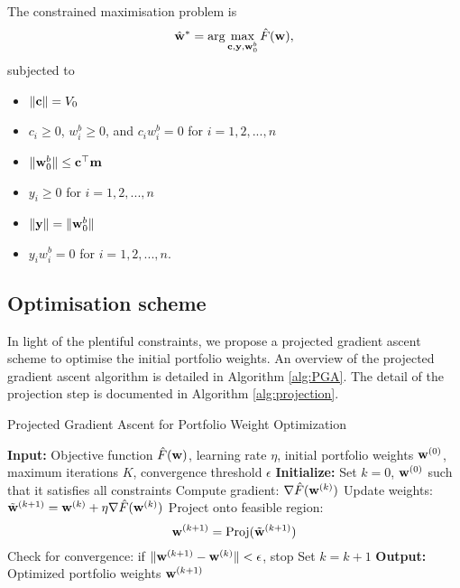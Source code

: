 \documentclass{article} %
\theoremstyle{plain}
\theoremstyle{definition} %
\begin{document}
The constrained maximisation problem is 
\begin{align}
\hat {\bf w}^* = \arg\max_{{\bf c}, {\bf y}, {\bf w}^b_0} \hat F({\bf w}),
\end{align}
subjected to 
\begin{itemize}
  \item $\|{\bf c}\| = V_0$
  \item $c_i \geq 0$, $w^b_i\geq 0$, and $c_iw^b_i = 0$ for $i=1,2,...,n$
  \item $\|{\bf w}^b_0\| \leq {\bf c}^\top {\bf m}$
  \item $y_i \geq 0$ for $i=1,2,...,n$
  \item $\|{\bf y}\| = \|{\bf w}^b_0\|$
  \item $y_iw^b_i = 0$ for $i=1,2,...,n$.
  \end{itemize}

\subsection{Optimisation scheme}
In light of the plentiful constraints, we propose a projected gradient ascent scheme to optimise the initial portfolio weights. 
 An overview of the projected gradient ascent algorithm is detailed in Algorithm \ref{alg:PGA}. 
 The detail of the projection step is documented in Algorithm \ref{alg:projection}.

\begin{algorithm}
  \caption{Projected Gradient Ascent for Portfolio Weight Optimization}\label{alg:PGA}
  \begin{algorithmic}[1]
  \STATE \textbf{Input:} Objective function $\hat F({\bf w})$, learning rate $\eta$, initial portfolio weights ${\bf w}^{(0)}$, maximum iterations $K$, convergence threshold $\epsilon$
  \STATE \textbf{Initialize:} Set $k = 0$, ${\bf w}^{(0)}$ such that it satisfies all constraints
      \STATE Compute gradient: $\nabla \hat F({\bf w}^{(k)})$
      \STATE Update weights: $\tilde{\bf w}^{(k+1)} = {\bf w}^{(k)} + \eta \nabla \hat F({\bf w}^{(k)})$
      \STATE Project onto feasible region:
      \[
        {\bf w}^{(k+1)} = \text{Proj}(\tilde{\bf w}^{(k+1)})
      \]
      \STATE Check for convergence: if $\|{\bf w}^{(k+1)} - {\bf w}^{(k)} \| < \epsilon$, stop
      \STATE Set $k = k + 1$
  \ENDWHILE
  \STATE \textbf{Output:} Optimized portfolio weights ${\bf w}^{(k+1)}$
  \end{algorithmic}
  \end{algorithm}
  
\end{document}
